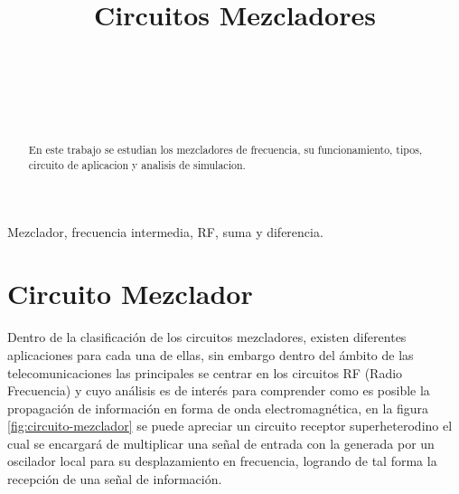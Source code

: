 \documentclass[conference]{IEEEtran}
\begin{document}
	
	\title{Circuitos Mezcladores}
	\author{
		\\
		\\
		\\
		\\
		\and
		\and
		\and
	}
	
	\maketitle
	\begin{abstract}
		En este trabajo se estudian los mezcladores de frecuencia, su funcionamiento, tipos, circuito de aplicacion y analisis de simulacion.
	\end{abstract}
	\begin{IEEEkeywords}
		Mezclador, frecuencia intermedia, RF, suma y diferencia.
	\end{IEEEkeywords}
	
	
	\section{Circuito Mezclador}
	
	Dentro de la clasificación de los circuitos mezcladores, existen diferentes aplicaciones para cada una de ellas, sin embargo dentro del ámbito de las telecomunicaciones las principales se centrar en los circuitos RF (Radio Frecuencia) y cuyo análisis es de interés para comprender como es posible la propagación de información en forma de onda electromagnética, en la figura \ref{fig:circuito-mezclador} se puede apreciar un circuito receptor superheterodino el cual se encargará de multiplicar una señal de entrada con la generada por un oscilador local para su desplazamiento en frecuencia, logrando de tal forma la recepción de una señal de información.
	
\end{document}
